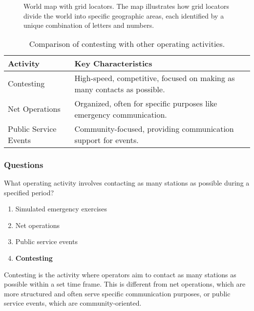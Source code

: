 \begin{figure}[h]
    \centering
    \caption{World map with grid locators. The map illustrates how grid locators divide the world into specific geographic areas, each identified by a unique combination of letters and numbers.}
    \label{fig:grid-locator-map}
\end{figure}

\begin{table}[h]
    \centering
    \begin{tabular}{|l|l|}
        \hline
        \textbf{Activity} & \textbf{Key Characteristics} \\
        \hline
        Contesting & High-speed, competitive, focused on making as many contacts as possible. \\
        Net Operations & Organized, often for specific purposes like emergency communication. \\
        Public Service Events & Community-focused, providing communication support for events. \\
        \hline
    \end{tabular}
    \caption{Comparison of contesting with other operating activities.}
    \label{tab:contesting-comparison}
\end{table}

\subsubsection{Questions}

\begin{tcolorbox}[colback=gray!10!white,colframe=black!75!black,title={T8C03}]
    What operating activity involves contacting as many stations as possible during a specified period?
    \begin{enumerate}[label=\Alph*),noitemsep]
        \item Simulated emergency exercises
        \item Net operations
        \item Public service events
        \item \textbf{Contesting}
    \end{enumerate}
\end{tcolorbox}
Contesting is the activity where operators aim to contact as many stations as possible within a set time frame. This is different from net operations, which are more structured and often serve specific communication purposes, or public service events, which are community-oriented.

